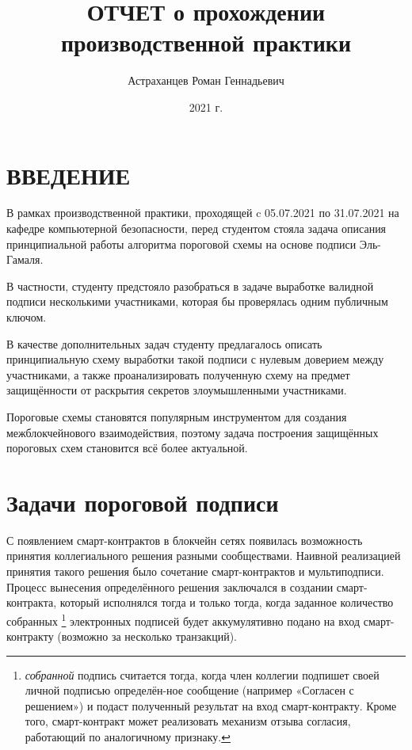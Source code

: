 \documentclass[a4paper,12pt]{article}
\author{Астраханцев Роман Геннадьевич}
\title{ОТЧЕТ о прохождении производственной практики}
\date{2021 г.}
\theoremstyle{definition}
\begin{document}
	
	\maketitle
	
	\newpage
	\tableofcontents
	
	\newpage
	\section*{ВВЕДЕНИЕ}
	
	В рамках производственной практики, проходящей c 05.07.2021 по 31.07.2021 на кафедре компьютерной безопасности, перед студентом стояла задача описания принципиальной работы алгоритма пороговой схемы на основе подписи Эль-Гамаля. 
	
	В частности, студенту предстояло разобраться в задаче выработке валидной подписи несколькими участниками, которая бы проверялась одним публичным ключом. 
	
	В качестве дополнительных задач студенту предлагалось описать принципиальную схему выработки такой подписи с нулевым доверием между участниками, а также проанализировать полученную схему на предмет защищённости от раскрытия секретов злоумышленными участниками. 
	
	Пороговые схемы становятся популярным инструментом для создания межблокчейнового взаимодействия, поэтому задача построения защищённых пороговых схем становится всё более актуальной.
	
	\newpage
	\section{Задачи пороговой подписи }	
	
	С появлением смарт-контрактов в блокчейн сетях появилась возможность принятия коллегиального решения разными сообществами. Наивной реализацией принятия такого решения было сочетание смарт-контрактов и мультиподписи. Процесс вынесения определённого решения заключался в создании смарт-контракта, который исполнялся тогда и только тогда, когда заданное количество собранных 
	\footnote{\textit{собранной} подпись считается тогда, когда член коллегии подпишет своей личной подписью определён-ное сообщение (например «Согласен с решением») и подаст полученный результат на вход смарт-контракту. Кроме того, смарт-контракт может реализовать механизм отзыва согласия, работающий по аналогичному признаку.}  
	электронных подписей будет аккумулятивно подано на вход смарт-контракту (возможно за несколько транзакций). 
	
\end{document}
